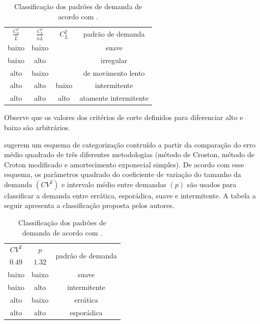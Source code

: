 \documentclass[11pt,letterpaper,twocolumn]{article}
\begin{document}
\begin{table}[h]
\begin{center}
\begin{tabular}[c]{c c c c}
\cline {1-4}
$\frac{C_{n}^{2}}{\bar{L}}$ & $\frac{C_{x}^{2}}{\bar{n}\bar{L}}$ & $C_{L}^{2}$ & padrão de demanda \\ \cline {1-4}
baixo & baixo &  & suave   \\ 
baixo & alto  &  & irregular   \\ 
alto  & baixo &  & de movimento lento   \\
alto  & alto  & baixo & intermitente   \\
alto  & alto  & alto  & atamente intermitente\\ \cline {1-4}
\end{tabular}
\label{tab:DemandPattern}
\caption{Classificação dos padrões de demanda de acordo com \cite{EavesKingsman2004}.}
\end{center}
\end{table}

Observe que os valores dos critérios de corte definidos para diferenciar alto e baixo são arbitrários.

\cite{SyntetosEtAl2005} sugerem um esquema de categorização contruído a partir da comparação do erro médio quadrado de três diferentes metodologias (método de Croston, método de Croton modificado e amortecimento exponecial simples). De acordo com esse esquema, os parâmetros quadrado do coeficiente de variação do tamanho da demanda $(CV^2)$ e intervalo médio entre demandas $(p)$ são usados para classificar a demanda entre errática, esporádica, suave e intermitente. A tabela a seguir apresenta a classificação proposta pelos autores.

\begin{table}[h]
\begin{center}
\begin{tabular}[c]{c c c}
\cline {1-3}
$CV^2$ & $p$ & \multirow{2}{*}{padrão de demanda} \\ 
$0.49$ & $1.32$ & \\ \cline {1-3}
baixo & baixo & suave   \\ 
baixo & alto  & intermitente   \\ 
alto  & baixo & errática   \\
alto  & alto  & esporádica  \\ \cline {1-3}
\end{tabular}
\label{tab:DemandPatternSybtetos}
\caption{Classificação dos padrões de demanda de acordo com \cite{SyntetosEtAl2005}.}
\end{center}
\end{table}
\end{document}
